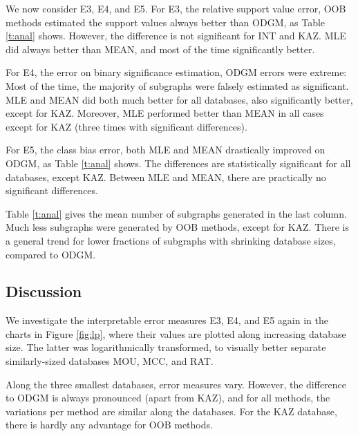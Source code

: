 \documentclass{sig-alternate}
\begin{document}
We now consider E3, E4, and E5. 
For E3, the relative support value error,
OOB methods estimated the support values always better than ODGM, as Table \ref{t:anal} shows. 
However, the difference is not significant for INT and KAZ.
MLE did always better than MEAN, and most of the time significantly better.

For E4, the error on binary significance estimation, ODGM errors were extreme: 
Most of the time, the majority of subgraphs were falsely estimated as significant. 
MLE and MEAN did both much better for all databases, also significantly better, except for KAZ. 
Moreover, MLE performed better than MEAN in
all cases except for KAZ (three times with significant differences). 

For E5, the class bias error, both MLE and MEAN drastically improved on ODGM, as
Table \ref{t:anal} shows. The differences
are statistically significant for all databases, except KAZ. Between MLE and MEAN,
there are practically no significant differences.

Table \ref{t:anal} gives the mean number of subgraphs generated in the
last column. Much less subgraphs were generated by OOB methods, except for KAZ.
There is a general trend for lower fractions of subgraphs
with shrinking database sizes, compared to ODGM. 

\subsection{Discussion}
We investigate the interpretable error measures E3, E4, and E5 again in
the charts in Figure \ref{fig:lp}, where their values are plotted along
increasing database size. The latter was logarithmically transformed, to
visually better separate similarly-sized databases MOU, MCC, and RAT. 

Along the three smallest databases, error measures vary. However, the difference
to ODGM is always pronounced (apart from KAZ), and for all methods, the variations per method
are similar along the databases. For the KAZ database, there is hardly any advantage for OOB methods.
\end{document}
